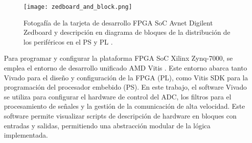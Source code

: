 \documentclass{report}
\begin{document}
\begin{figure}[H]
    \centering
    \texttt{[image: zedboard\_and\_block.png]}
    \caption{Fotogafía de la tarjeta de desarrollo FPGA SoC Avnet Digilent Zedboard y descripción en diagrama de bloques de la distribución de los periféricos en el PS y PL \cite{avnet_zedboard}.}
    \label{fig:zedboard}
\end{figure}

\noindent Para programar y configurar la plataforma FPGA SoC Xilinx Zynq-7000, se emplea el entorno de desarrollo unificado AMD Vitis \cite{vitis_xilinx}. Este entorno abarca tanto Vivado \cite{vivado} para el diseño y configuración de la FPGA (PL), como Vitis SDK para la programación del procesador embebido (PS). En este trabajo, el software Vivado se utiliza para configurar el hardware de control del ADC, los filtros para el procesamiento de señales y la gestión de la comunicación de alta velocidad. Este software permite visualizar scripts de descripción de hardware en bloques con entradas y salidas, permitiendo una abstracción modular de la lógica implementada.\\

\end{document}
